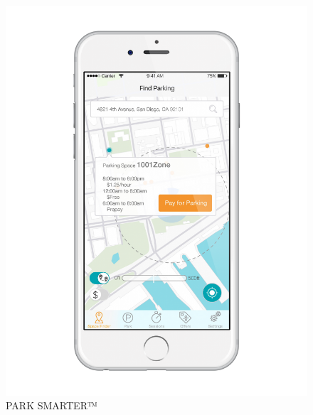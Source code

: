 \documentclass{VUMIFPSkursinis}
\begin{document}
\begin{enumerate}
\begin{samepage}
			\begin{figure}[H]
				\centering
				\includegraphics[scale=0.3]{img/smartpark}
				\caption{PARK SMARTER™}
				\label{img:smartpark}
			\end{figure}
		\end{samepage}
\end{enumerate}
\end{document}
